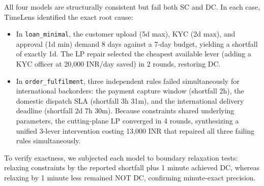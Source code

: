 \documentclass[conference]{IEEEtran}
\begin{document}
\begin{table}[t]
\centering
\caption{Controllability Checking, Conflict Diagnosis, and Minimal-Cost Repair Across Domain Processes}
\label{tab:domain_results}
\end{table}

All four models are structurally consistent but fail both SC and DC. In each case, TimeLens identified the exact root cause:
\begin{itemize}
    \item In \texttt{loan\_minimal}, the customer upload (5d max), KYC (2d max), and approval (1d min) demand 8 days against a 7-day budget, yielding a shortfall of exactly 1d. The LP repair selected the cheapest available lever (adding a KYC officer at 20,000 INR/day saved) in 2 rounds, restoring DC.
    \item In \texttt{order\_fulfilment}, three independent rules failed simultaneously for international backorders: the payment capture window (shortfall 2h), the domestic dispatch SLA (shortfall 3h 31m), and the international delivery deadline (shortfall 2d 7h 30m). Because constraints shared underlying parameters, the cutting-plane LP converged in 4 rounds, synthesizing a unified 3-lever intervention costing 13,000 INR that repaired all three failing rules simultaneously.
\end{itemize}
To verify exactness, we subjected each model to boundary relaxation tests: relaxing constraints by the reported shortfall plus 1 minute achieved DC, whereas relaxing by 1 minute less remained NOT DC, confirming minute-exact precision.
\end{document}
